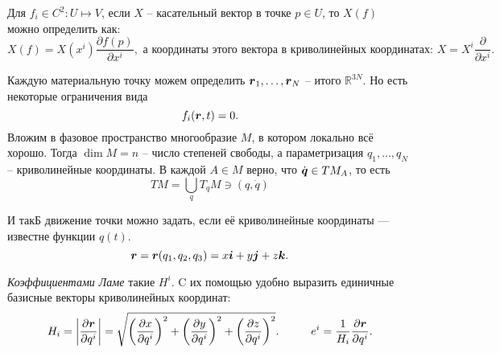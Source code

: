 \begin{to_lem}[Из матана]
	Для $f_i \in  C^2 \colon U \mapsto V$, если $X$ -- касательный вектор в точке $p \in U$, то $X(f)$ можно определить как:
	\begin{equation*}
		X(f) = X(x^i) \frac{\partial f(p)}{\partial x^i}, \text{ а координаты этого вектора в криволинейных координатах: } X = X^i \frac{\partial}{\partial x^i}.
	\end{equation*}
\end{to_lem}

Каждую материальную точку можем определить $\mbox{\boldmath $r$}_1, \ldots, \mbox{\boldmath $r$}_N$ -- итого $\mathbb{R}^{3N}$. Но есть некоторые ограничения вида
\begin{equation*}
    f_i (\mbox{\boldmath $r$}, t) = 0.
\end{equation*}
Вложим в фазовое пространство многообразие $M$, в котором локально всё хорошо. Тогда
$\dim M = n$ -- число степеней свободы, а параметризация $q_1, \ldots, q_N$ -- криволинейные координаты. В каждой $A \in M$ верно, что $\dot{\mbox{\boldmath $q$}} \in TM_A$, то есть
\begin{equation}
    TM = \bigcup_q T_qM \ni (q, \dot{q})
\end{equation}

И такБ движение точки можно задать, если её криволинейные координаты --- известне функции $q(t)$.
\begin{equation*}
	\mbox{\boldmath $r$} = \mbox{\boldmath $r$}(q_1, q_2, q_3) = x \mbox{\boldmath $i$} + y \mbox{\boldmath $j$} + z \mbox{\boldmath $k$}.
\end{equation*}

\begin{to_def}
	\textit{Коэффициентами Ламе} такие $H^i$. C их помощью удобно выразить единичные базисные векторы криволинейных координат: 
	\begin{equation*}
		H_i = \left|\frac{\partial \mbox{\boldmath $r$}}{\partial q^i} \right| = \sqrt{\left(\frac{\partial x}{\partial q^i}\right)^2 + \left(\frac{\partial y}{\partial q^i}\right)^2 + \left(\frac{\partial z}{\partial q^i}\right)^2}.
		\hspace*{1 cm}
		e^i = \frac{1}{H_i} \frac{\partial \mbox{\boldmath $r$}}{\partial q^i}.
	\end{equation*}
\end{to_def}

